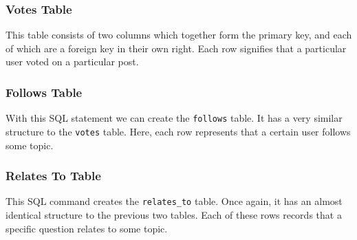 \subsubsection{Votes Table}

This table consists of two columns which together form the primary key, and each of which are a foreign key in their own right. Each row signifies that a particular user voted on a particular post.


\subsubsection{Follows Table}

With this SQL statement we can create the \verb`follows` table. It has a very similar structure to the \verb`votes` table. Here, each row represents that a certain user follows some topic.


\subsubsection{Relates To Table}

This SQL command creates the \verb`relates_to` table. Once again, it has an almost identical structure to the previous two tables. Each of these rows records that a specific question relates to some topic.

